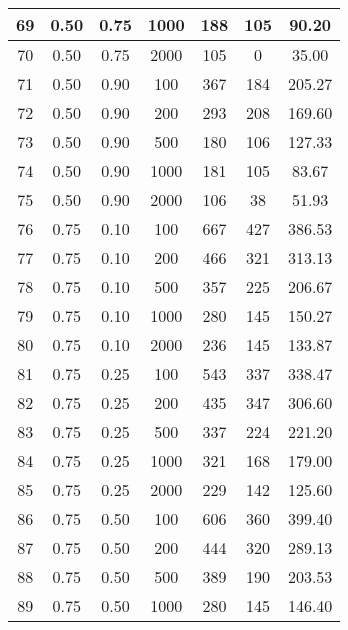 \documentclass[a4paper, 12pt, unknownkeysallowed]{extreport}
\begin{document}
\begin{center}
\begin{longtable}[c]{|c|c|c|c|c|c|c|}
  69 & 0.50 & 0.75 &  1000 &  188 &  105 & 90.20 \\ \hline
  70 & 0.50 & 0.75 &  2000 &  105 &    0 & 35.00 \\ \hline
  71 & 0.50 & 0.90 &   100 &  367 &  184 & 205.27 \\ \hline
  72 & 0.50 & 0.90 &   200 &  293 &  208 & 169.60 \\ \hline
  73 & 0.50 & 0.90 &   500 &  180 &  106 & 127.33 \\ \hline
  74 & 0.50 & 0.90 &  1000 &  181 &  105 & 83.67 \\ \hline
  75 & 0.50 & 0.90 &  2000 &  106 &   38 & 51.93 \\ \hline
  76 & 0.75 & 0.10 &   100 &  667 &  427 & 386.53 \\ \hline
  77 & 0.75 & 0.10 &   200 &  466 &  321 & 313.13 \\ \hline
  78 & 0.75 & 0.10 &   500 &  357 &  225 & 206.67 \\ \hline
  79 & 0.75 & 0.10 &  1000 &  280 &  145 & 150.27 \\ \hline
  80 & 0.75 & 0.10 &  2000 &  236 &  145 & 133.87 \\ \hline
  81 & 0.75 & 0.25 &   100 &  543 &  337 & 338.47 \\ \hline
  82 & 0.75 & 0.25 &   200 &  435 &  347 & 306.60 \\ \hline
  83 & 0.75 & 0.25 &   500 &  337 &  224 & 221.20 \\ \hline
  84 & 0.75 & 0.25 &  1000 &  321 &  168 & 179.00 \\ \hline
  85 & 0.75 & 0.25 &  2000 &  229 &  142 & 125.60 \\ \hline
  86 & 0.75 & 0.50 &   100 &  606 &  360 & 399.40 \\ \hline
  87 & 0.75 & 0.50 &   200 &  444 &  320 & 289.13 \\ \hline
  88 & 0.75 & 0.50 &   500 &  389 &  190 & 203.53 \\ \hline
  89 & 0.75 & 0.50 &  1000 &  280 &  145 & 146.40 \\ \hline
  \end{longtable}
\end{center}
\end{document}
